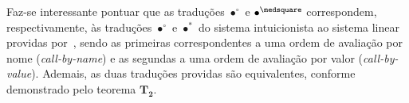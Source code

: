     Faz-se interessante pontuar que as traduções $\bullet^\circ$ e $\bullet^\medsquare$ correspondem, respectivamente, às traduções $\bullet^\circ$ e $\bullet^*$ do sistema intuicionista ao sistema linear providas por~\cite{Girard}, sendo as primeiras correspondentes a uma ordem de avaliação por nome (\textit{call-by-name}) e as segundas a uma ordem de avaliação por valor (\textit{call-by-value}). 
    Ademais, as duas traduções providas são equivalentes, conforme demonstrado pelo teorema $\mathbf{T_2}$.

